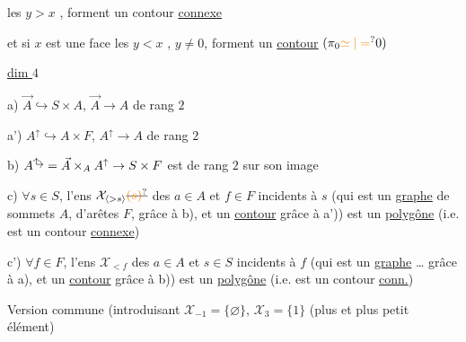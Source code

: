 
les $y>x$ ,  forment un
contour \uline{connexe}

et si $x$ est une face
les $y<x$ , $y\ne0$,
forment un \uline{contour}
$(\pi_0\unsure{\simeq|=}0)$

\uline{dim $4$}

a) $\vec A\hookrightarrow S\times A$,  $\vec A\to A$ de rang $2$

a') $A^\uparrow\hookrightarrow A\times F$, \quad $A^\uparrow\to A$ de rang $2$


b) $A^{\vcenter{\hbox{\tikz[x=.15cm,y=.15cm]{\draw[->] (0,0)--(0,1.2);\draw[->] (0,0)--(1.3,0);}}}}=\vec A\times_A A^\uparrow\to S\times F$ est de rang $2$ sur son image

c) $\forall s\in S$, l'ens $\mathcal X_{\inserted{>s}}\deleted{\unsure{(s)}}$ des $a\in A$ et $f\in F$
incidents à $s$ (qui est un \uline{graphe} de
sommets $A$, d'arêtes $F$, grâce à b), et
\unsure{$=$|$\subset$|$\simeq$} un \uline{contour} grâce à a')) est un
\uline{polygône} (i.e. est un contour \inserted{$\ne\varnothing$} \uline{connexe})

c') $\forall f\in F$, l'ens $\mathcal X_{<f}$ des $a\in A$ et $s\in S$
incidents à $f$ (qui est un \uline{graphe} \ldots{}
grâce à a), et un \uline{contour} grâce à b))
est un \uline{polygône} (i.e. est un contour \inserted{$\ne\varnothing$} \uline{conn.})

Version commune (introduisant $\mathcal X_{-1}=\{\varnothing\}$, $\mathcal X_3=\{1\}$ (plus 
et plus petit élément)

